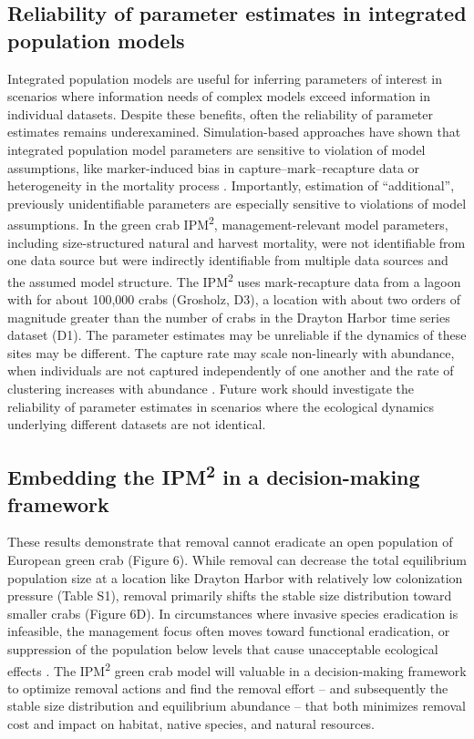 \documentclass{article}
\begin{document}
\subsection{Reliability of parameter estimates in integrated population models}

Integrated population models are useful for inferring parameters of interest in scenarios where information needs of complex models exceed information in individual datasets. Despite these benefits, often the reliability of parameter estimates remains underexamined. Simulation-based approaches have shown that integrated population model parameters are sensitive to violation of model assumptions, like marker-induced bias in capture–mark–recapture data or heterogeneity in the mortality process \parencite{riecke2019integrated}. Importantly, estimation of “additional”, previously unidentifiable parameters are especially sensitive to violations of model assumptions. In the green crab IPM\textsuperscript{2}, management-relevant model parameters, including size-structured natural and harvest mortality, were not identifiable from one data source but were indirectly identifiable from multiple data sources and the assumed model structure. The IPM\textsuperscript{2} uses mark-recapture data from a lagoon with  for about 100,000 crabs (Grosholz, D3), a location with about two orders of magnitude greater than the number of crabs in the Drayton Harbor time series dataset (D1). The parameter estimates may be unreliable if the dynamics of these sites may be different. The capture rate may scale non-linearly with abundance, when individuals are not captured independently of one another and the rate of clustering increases with abundance \parencite{mccarthy2013influence}. Future work should investigate the reliability of parameter estimates in scenarios where the ecological dynamics underlying different datasets are not identical. 

\subsection{Embedding the IPM\textsuperscript{2} in a decision-making framework}

These results demonstrate that removal cannot eradicate an open population of European green crab (Figure 6). While removal can decrease the total equilibrium population size at a location like Drayton Harbor with relatively low colonization pressure (Table S1), removal primarily shifts the stable size distribution toward smaller crabs (Figure 6D). In circumstances where invasive species eradication is infeasible, the management focus often moves toward functional eradication, or suppression of the population below levels that cause unacceptable ecological effects \parencite{green2021functional}. The IPM\textsuperscript{2} green crab model will valuable in a decision-making framework to optimize removal actions and find the removal effort – and subsequently the stable size distribution and equilibrium abundance – that both minimizes removal cost and impact on habitat, native species, and natural resources. 
\end{document}
